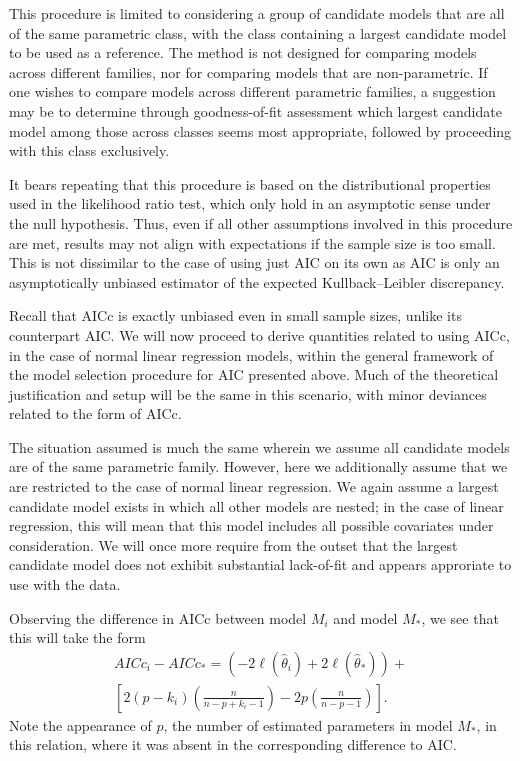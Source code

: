 		This procedure is limited to considering a group of candidate models that are all of the same parametric class, with the class containing a largest candidate
		model to be used as a reference. The method is not designed for comparing models across different families, nor for comparing models that are non-parametric.
		If one wishes to compare models across different parametric families, a suggestion may be to determine through goodness-of-fit assessment which largest candidate model
		among those across classes seems most appropriate, followed by proceeding with this class exclusively.

		It bears repeating that this procedure is based on the distributional properties used in the likelihood ratio test, which only hold in an asymptotic sense under the
		null hypothesis. Thus, even if all other assumptions involved in this procedure are met, results may not align with expectations if the sample size is too small. This is not
		dissimilar to the case of using just AIC on its own as AIC is only an asymptotically unbiased estimator of the expected Kullback–Leibler discrepancy.

		Recall that AICc is exactly unbiased even in small sample sizes, unlike its counterpart AIC. We will now proceed to derive quantities related to using AICc,
		in the case of normal linear regression models, within the general framework of the model selection procedure for AIC presented above. Much of the theoretical
		justification and setup will be the same in this scenario, with minor deviances related to the form of AICc.

		The situation assumed is much the same wherein we assume all candidate models are of the same parametric family. However, here we additionally assume that we are
		restricted to the case of normal linear regression. We again assume a largest candidate model exists in which all other models are nested; in the case of linear
		regression, this will mean that this model includes all possible covariates under consideration. We will once more require from the outset that the largest candidate
		model does not exhibit substantial lack-of-fit and appears approriate to use with the data.

		Observing the difference in AICc between model $M_i$ and model $M_*$, we see that
		this will take the form
		\begin{equation}
			\begin{split}
			AICc_i - AICc_* = (-2 \ell (\hat{\theta}_i) + 2 \ell (\hat{\theta}_*) ) + \\
			\left[ 2(p-k_i) \left( \frac{n}{n-p+k_i-1} \right) - 2p \left( \frac{n}{n-p-1} \right) \right] .
			\end{split}
		\end{equation}
		Note the appearance of $p$, the number of estimated parameters in model $M_*$, in this relation, where it was absent in the corresponding difference to AIC.

